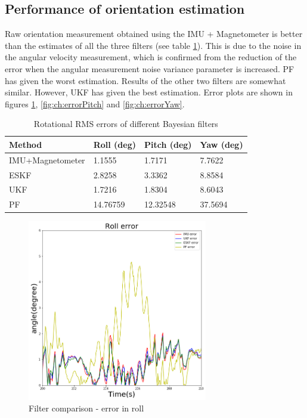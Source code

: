 \subsection{Performance of orientation estimation}
Raw orientation measurement obtained using the \gls{IMU} + Magnetometer is better than the estimates of all the three filters (see table \ref{table:ch:RMSErrorRotation}). This is due to the noise in the angular velocity measurement, which is confirmed from the reduction of the error when the angular measurement noise variance parameter is increased. \gls{PF} has given the worst estimation. Results of the other two filters are somewhat similar. However, \gls{UKF} has given the best
estimation. Error plots are shown in figures \ref{fig:ch:errorRoll}, \ref{fig:ch:errorPitch} and \ref{fig:ch:errorYaw}.
\begin{table}[h]
    \centering
    \begin{tabular}{|p{4cm}|p{3cm}|p{3cm}|p{3cm}|} 
        \hline
        \textbf{Method} & \textbf{Roll (deg)} & \textbf{Pitch (deg)} & \textbf{Yaw (deg)} \\
        \hline
        \gls{IMU}+Magnetometer & 1.1555 &1.7171 &7.7622\\
        \hline
        ESKF& 2.8258& 3.3362& 8.8584\\
        \hline
        UKF &1.7216& 1.8304& 8.6043
        \\
        \hline
        PF &14.76759& 12.32548 &37.5694
        \\
        \hline
    \end{tabular}
    \caption{Rotational \gls{RMS} errors of different Bayesian filters}
    \label{table:ch:RMSErrorRotation}
\end{table}

\begin{figure}[h]
\centering
	\includegraphics[width=0.7\textwidth]{figs/roll.png}
    \vspace{-0.5cm}
	\caption{Filter comparison - error in roll}
	\label{fig:ch:errorRoll}
    \vspace{0.5cm}
\end{figure}

